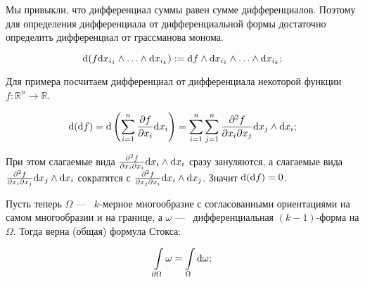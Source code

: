 \documentclass{article}
\begin{document}
	Мы привыкли, что дифференциал суммы равен сумме дифференциалов. Поэтому для определения дифференциала от дифференциальной формы достаточно определить дифференциал от грассманова монома.

	\[ \mathrm{d}(f \mathrm{d} x_{i_1} \land \ldots \land \mathrm{d} x_{i_k}) := \mathrm{d} f \land \mathrm{d} x_{i_1} \land \ldots \land \mathrm{d} x_{i_k}; \]

	Для примера посчитаем дифференциал от дифференциала некоторой функции $f:\mathbb{R}^n \to \mathbb{R}$.

	\[\mathrm{d} (\mathrm{d} f) = \mathrm{d} \left(\sum_{i = 1}^n \frac{\partial f}{\partial x_i}\mathrm{d} x_i \right) = \sum_{i = 1}^n \sum_{j = 1}^n \frac{\partial^2 f}{\partial x_i \partial x_j} \mathrm{d} x_j \land \mathrm{d} x_i; \]

	При этом слагаемые вида $\frac{\partial^2 f}{\partial x_i \partial x_i} \mathrm{d} x_i \land \mathrm{d} x_i$ сразу зануляются, а слагаемые вида $\frac{\partial^2 f}{\partial x_i \partial x_j} \mathrm{d} x_j \land \mathrm{d} x_i$ сократятся с $\frac{\partial^2 f}{\partial x_j \partial x_i} \mathrm{d} x_i \land \mathrm{d} x_j$. Значит $\mathrm{d}(\mathrm{d} f) = 0$.

	Пусть теперь $\Omega$ ---~ $k$-мерное многообразие с согласованными ориентациями на самом многообразии и на границе, а $\omega$ ---~ дифференциальная $(k - 1)$-форма на $\Omega$. Тогда верна (общая) формула Стокса:

	\[ \int\limits_{\partial \Omega} \omega = \int\limits_\Omega \mathrm{d} \omega; \] 
\end{document}
